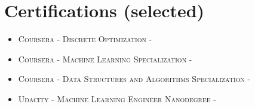 \documentclass[10pt]{article}
\newcommand{\blackhref}[3][black]{\href{#2}{\color{#1}{#3}}}%
\begin{document}
    \vspace{2mm}
    \section{Certifications (selected)}
    \begin{itemize}[noitemsep,leftmargin=*]
        \item \textsc{Coursera - Discrete Optimization - } \blackhref{https://www.coursera.org/account/accomplishments/verify/YXTNUBC3G3LX}{\faGraduationCap}
        \item \textsc{Coursera - Machine Learning Specialization - } \blackhref{https://www.coursera.org/account/accomplishments/specialization/3P6TZYWVJKHY}{\faGraduationCap}
        \item \textsc{Coursera - Data Structures and Algorithms Specialization - } \blackhref{https://www.coursera.org/account/accomplishments/specialization/AKFYZQ9QD8XH}{\faGraduationCap}
        \item \textsc{Udacity - Machine Learning Engineer Nanodegree - } \blackhref{https://graduation.udacity.com/confirm/HK9JLR3N}{\faGraduationCap}
    \end{itemize}
\end{document}
